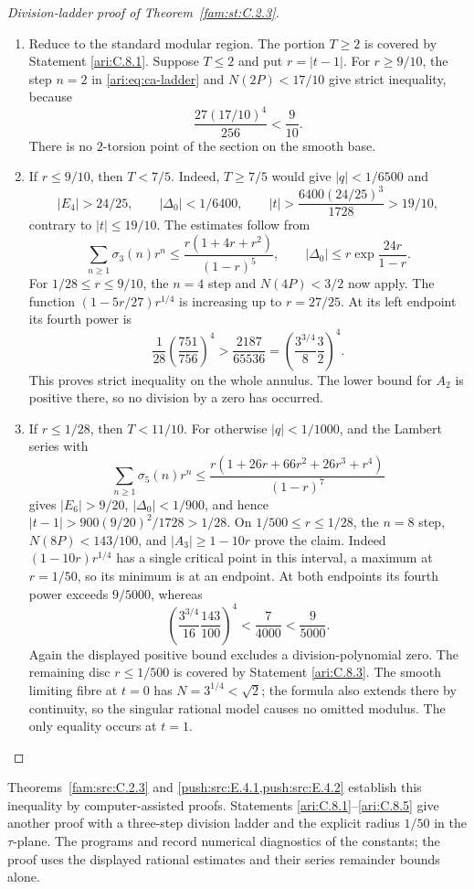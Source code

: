 \begin{proof}[Division-ladder proof of Theorem~\ref{fam:st:C.2.3}]
\begin{enumerate}[label=\arabic*.,leftmargin=*]
\item Reduce to the standard modular region. The portion $T\ge2$
is covered by Statement \ref{ari:C.8.1}. Suppose $T\le2$ and put
$r=|t-1|$. For $r\ge9/10$, the step $n=2$ in
\eqref{ari:eq:ca-ladder} and $N(2P)<17/10$ give strict inequality,
because
\[
 \frac{27(17/10)^4}{256}<\frac9{10}.
\]
There is no $2$-torsion point of the section on the smooth base.

\item If $r\le9/10$, then $T<7/5$. Indeed, $T\ge7/5$ would give
$|q|<1/6500$ and
\[
 |E_4|>24/25,\qquad |\Delta_0|<1/6400,
 \qquad |t|>\frac{6400(24/25)^3}{1728}>19/10,
\]
contrary to $|t|\le19/10$. The estimates follow from
\[
 \sum_{n\ge1}\sigma_3(n)r^n
 \le\frac{r(1+4r+r^2)}{(1-r)^5},\qquad
 |\Delta_0|\le r\exp\frac{24r}{1-r}.
\]
For $1/28\le r\le9/10$, the $n=4$ step and
$N(4P)<3/2$ now apply. The function
$(1-5r/27)r^{1/4}$ is increasing up to $r=27/25$.
At its left endpoint its fourth power is
\[
 \frac1{28}\left(\frac{751}{756}\right)^4
 >\frac{2187}{65536}
 =\left(\frac{3^{3/4}}8\frac32\right)^4.
\]
This proves strict inequality on the whole annulus. The lower
bound for $A_2$ is positive there, so no division by a zero has
occurred.

\item If $r\le1/28$, then $T<11/10$. For otherwise $|q|<1/1000$,
and the Lambert series with
\[
 \sum_{n\ge1}\sigma_5(n)r^n
 \le\frac{r(1+26r+66r^2+26r^3+r^4)}{(1-r)^7}
\]
gives $|E_6|>9/20$, $|\Delta_0|<1/900$, and hence
$|t-1|>900(9/20)^2/1728>1/28$.
On $1/500\le r\le1/28$, the $n=8$ step,
$N(8P)<143/100$, and $|A_3|\ge1-10r$ prove the claim.
Indeed $(1-10r)r^{1/4}$ has a single critical point in this
interval, a maximum at $r=1/50$, so its minimum is at an endpoint.
At both endpoints its fourth power exceeds $9/5000$, whereas
\[
 \left(\frac{3^{3/4}}{16}\frac{143}{100}\right)^4
 <\frac7{4000}<\frac9{5000}.
\]
Again the displayed positive bound excludes a division-polynomial
zero. The remaining disc $r\le1/500$ is covered by Statement
\ref{ari:C.8.3}. The smooth limiting fibre at $t=0$ has
$N=3^{1/4}<\sqrt2$; the formula also extends there by
continuity, so the singular rational model causes no omitted
modulus. The only equality occurs at $t=1$.
\end{enumerate}
\end{proof}

Theorems~\ref{fam:src:C.2.3} and \cref{push:src:E.4.1,push:src:E.4.2} establish this inequality by
computer-assisted proofs. Statements \ref{ari:C.8.1}--\ref{ari:C.8.5} give another
proof with a three-step division ladder and the explicit radius
$1/50$ in the $\tau$-plane. The programs
 and
 record numerical diagnostics
of the constants; the proof uses the displayed rational estimates
and their series remainder bounds alone.




